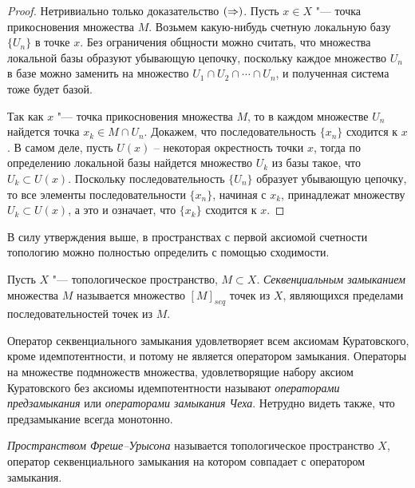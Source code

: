 \begin{proof}
    Нетривиально только доказательство $(\Rightarrow)$. Пусть $x \in X$ "--- точка прикосновения множества $M$. Возьмем какую-нибудь счетную локальную базу $\{U_n\}$ в точке $x$. Без ограничения общности можно считать, что множества локальной базы образуют убывающую цепочку, поскольку каждое множество $U_n$ в базе можно заменить на множество $U_1\cap U_2\cap\dotsb\cap U_n$, и полученная система тоже будет базой.

    Так как $x$ "--- точка прикосновения множества $M$, то в каждом множестве $U_n$ найдется точка $x_k \in M\cap U_n$. Докажем, что последовательность $\{x_n\}$ сходится к $x$. В самом деле, пусть $U(x)$ -- некоторая окрестность точки $x$, тогда по определению локальной базы найдется множество $U_k$ из базы такое, что $U_k\subset U(x)$. Поскольку последовательность $\{U_n\}$ образует убывающую цепочку, то все элементы последовательности $\{x_n\}$, начиная с $x_k$, принадлежат множеству $U_k\subset U(x)$, а это и означает, что $\{x_k\}$ сходится к $x$.
\end{proof}

\begin{note}
    В силу утверждения выше, в пространствах с первой аксиомой счетности топологию можно полностью определить с помощью сходимости.
\end{note}

\begin{definition}
    Пусть $X$ "--- топологическое пространство, $M \subset X$. \textit{Секвенциальным замыканием} множества $M$ называется множество $[M]_{seq}$ точек из $X$, являющихся пределами последовательностей точек из $M$.
\end{definition}

\begin{note}
    Оператор секвенциального замыкания удовлетворяет всем аксиомам Куратовского, кроме идемпотентности, и потому не является оператором замыкания. Операторы на множестве подмножеств множества, удовлетворящие набору аксиом Куратовского без аксиомы идемпотентности называют \emph{операторами предзамыкания} или \emph{операторами замыкания Чеха}. Нетрудно видеть также, что предзамыкание всегда монотонно.
\end{note}

\begin{definition}
    \textit{Пространством Фреше--Урысона} называется топологическое пространство $X$, оператор секвенциального замыкания на котором совпадает с оператором замыкания.
\end{definition}

